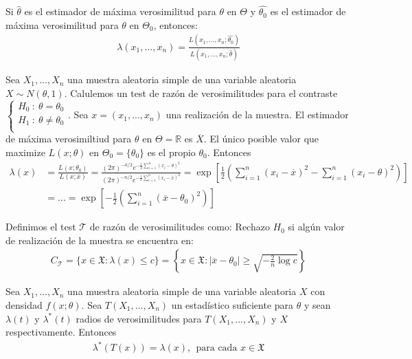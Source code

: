 \begin{obs}
    Si $\hat{\theta}$ es el estimador de máxima verosimilitud para $\theta$ en $\Theta$ y $\hat{\theta_0}$ es el estimador de máxima verosimilitud para $\theta$ en $\Theta_0$, entonces:
    \begin{align*}
        \lambda(x_1,...,x_n) = \frac{L(x_1,...,x_n;\hat{\theta_0})}{L(x_1,...,x_n;\hat{\theta})}
    \end{align*}
\end{obs}

\begin{ejemplo}
    Sea $X_1,...,X_n$ una muestra aleatoria simple de una variable aleatoria $X \sim N(\theta,1)$. Calulemos un test de razón de verosimilitudes para el contraste $
        \left\{ \begin{array}{lcc}
            H_0 \ : \ \theta = \theta_0      \\
            H_1 \ : \ \theta \not = \theta_0 \\
        \end{array}
        \right.
    $.
    Sea $x = (x_1,...,x_n)$ una realización de la muestra. El estimador de máxima verosimiltiud para $\theta$ en $\Theta = \mathbb{R}$ es $\overline{X}$. El único posible valor que maximize $L(x;\theta)$ en $\Theta_0 = \{\theta_0\}$ es el propio $\theta_0$. Entonces
    \begin{align*}
        \lambda(x) & = \frac{L(x;\theta_0)}{L(x;\overline{x})} = \frac{(2\pi)^{-n/2}e^{-\frac{1}{2} \sum_{i=1}^{n} (x_i -\theta)^2} }{(2\pi)^{-n/2}e^{-\frac{1}{2} \sum_{i=1}^{n} (x_i -\overline{x})^2}}
        = \exp\left[ \frac{1}{2}\left(\sum_{i=1}^{n} (x_i -\overline{x})^2 - \sum_{i=1}^{n} (x_i -\theta)^2\right) \right]                                                                                \\
                   & = ... = \exp\left[ -\frac{1}{2}\left(\sum_{i=1}^{n} (\overline{x} -\theta_0)^2 \right) \right]
    \end{align*}
\end{ejemplo}
Definimos el test $\mathcal{T}$ de razón de verosimilitudes como: Rechazo $H_0$ si algún valor de realización de la muestra se encuentra en:
\begin{align*}
    C_{\mathcal{T}} = \{ x \in \mathfrak{X} : \lambda(x) \leq c\} = \left\{ x \in \mathfrak{X} : |\overline{x} - \theta_0| \ge \sqrt{-\frac{2}{n}\log c}\right\}
\end{align*}

\begin{teo}
    Sea $X_1,...,X_n$ una muestra aleatoria simple de una variable aleatoria $X$ con densidad $f(x;\theta)$. Sea $T(X_1,...,X_n)$ un estadístico suficiente para $\theta$ y sean $\lambda(t)$ y $\lambda^*(t)$ radios de verosimilitudes para $T(X_1,...,X_n)$ y $X$ respectivamente. Entonces
    \begin{align*}
        \lambda^*(T(x)) = \lambda(x), \ \ \text{para cada } x \in \mathfrak{X}
    \end{align*}
\end{teo}

